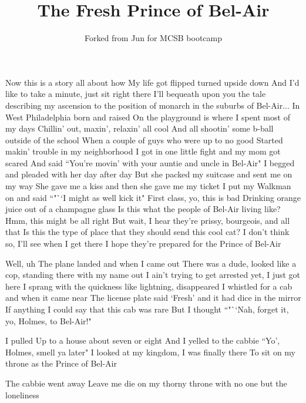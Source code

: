 \documentclass{article}
\title{The Fresh Prince of Bel-Air}
\author{Forked from Jun for MCSB bootcamp}
\begin{document}
\maketitle

Now this is a story all about how
My life got flipped turned upside down
And I'd like to take a minute, just sit right there
I'll bequeath upon you the tale describing my ascension to the position of monarch in the suburbs of Bel-Air...
In West Philadelphia born and raised
On the playground is where I spent most of my days
Chillin' out, maxin', relaxin' all cool
And all shootin' some b-ball outside of the school
When a couple of guys who were up to no good
Started makin' trouble in my neighborhood
I got in one little fight and my mom got scared
And said ``You're movin' with your auntie and uncle in Bel-Air"
I begged and pleaded with her day after day
But she packed my suitcase and sent me on my way
She gave me a kiss and then she gave me my ticket
I put my Walkman on and said ``"``I might as well kick it"
First class, yo, this is bad
Drinking orange juice out of a champagne glass
Is this what the people of Bel-Air living like?
Hmm, this might be all right
But wait, I hear they're prissy, bourgeois, and all that
Is this the type of place that they should send this cool cat?
I don't think so, I'll see when I get there
I hope they're prepared for the Prince of Bel-Air

Well, uh
The plane landed and when I came out
There was a dude, looked like a cop, standing there with my name out
I ain't trying to get arrested yet, I just got here
I sprang with the quickness like lightning, disappeared
I whistled for a cab and when it came near
The license plate said `Fresh' and it had dice in the mirror
If anything I could say that this cab was rare
But I thought ``"``Nah, forget it, yo, Holmes, to Bel-Air!"

I pulled
Up to a house about seven or eight
And I yelled to the cabbie ``Yo', Holmes, smell ya later"
I looked at my kingdom, I was finally there
To sit on my throne as the Prince of Bel-Air

The cabbie went away
Leave me die on my thorny throne
with no one but the loneliness
\end{document}
